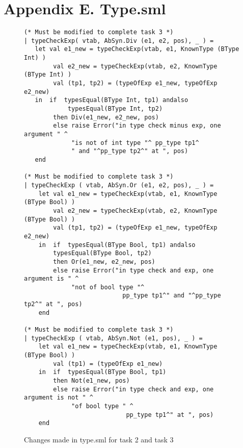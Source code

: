 \documentclass[12pt,a4paper,english]{article}
\begin{document}
\section{Appendix E. Type.sml}
\begin{figure}[h]
\begin{lstlisting}
(* Must be modified to complete task 3 *)
| typeCheckExp( vtab, AbSyn.Div (e1, e2, pos), _ ) =
   let val e1_new = typeCheckExp(vtab, e1, KnownType (BType Int) )
        val e2_new = typeCheckExp(vtab, e2, KnownType (BType Int) )
        val (tp1, tp2) = (typeOfExp e1_new, typeOfExp e2_new)
   in  if  typesEqual(BType Int, tp1) andalso 
            typesEqual(BType Int, tp2)
        then Div(e1_new, e2_new, pos)
        else raise Error("in type check minus exp, one argument " ^
			 "is not of int type "^ pp_type tp1^
			 " and "^pp_type tp2^" at ", pos)
   end

(* Must be modified to complete task 3 *)
| typeCheckExp ( vtab, AbSyn.Or (e1, e2, pos), _ ) =
    let val e1_new = typeCheckExp(vtab, e1, KnownType (BType Bool) )
        val e2_new = typeCheckExp(vtab, e2, KnownType (BType Bool) )
        val (tp1, tp2) = (typeOfExp e1_new, typeOfExp e2_new)
    in  if  typesEqual(BType Bool, tp1) andalso 
	    typesEqual(BType Bool, tp2)
        then Or(e1_new, e2_new, pos)
        else raise Error("in type check and exp, one argument is " ^ 
			 "not of bool type "^
                           pp_type tp1^" and "^pp_type tp2^" at ", pos)
    end    

(* Must be modified to complete task 3 *)
| typeCheckExp ( vtab, AbSyn.Not (e1, pos), _ ) =
    let val e1_new = typeCheckExp(vtab, e1, KnownType (BType Bool) )
        val (tp1) = (typeOfExp e1_new)
    in  if  typesEqual(BType Bool, tp1)
        then Not(e1_new, pos)
        else raise Error("in type check and exp, one argument is not " ^
			 "of bool type " ^
                            pp_type tp1^" at ", pos)
    end   
\end{lstlisting}
\caption{Changes made in type.sml for task 2 and task 3}\end{figure}
\end{document}
